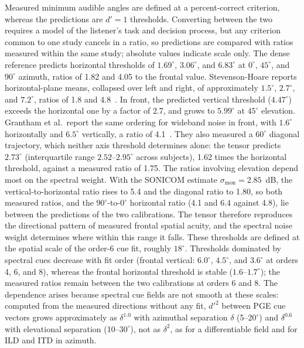 \documentclass[journal]{IEEEtran}
\begin{document}
Measured minimum audible angles are defined at a percent-correct criterion, whereas the predictions are \(d'=1\) thresholds. Converting between the two requires a model of the listener's task and decision process, but any criterion common to one study cancels in a ratio, so predictions are compared with ratios measured within the same study; absolute values indicate scale only. The dense reference predicts horizontal thresholds of \(1.69^\circ\), \(3.06^\circ\), and \(6.83^\circ\) at \(0^\circ\), \(45^\circ\), and \(90^\circ\) azimuth, ratios of 1.82 and 4.05 to the frontal value. Stevenson-Hoare reports horizontal-plane means, collapsed over left and right, of approximately \(1.5^\circ\), \(2.7^\circ\), and \(7.2^\circ\), ratios of 1.8 and 4.8~\cite{StevensonHoare2020}. In front, the predicted vertical threshold (\(4.47^\circ\)) exceeds the horizontal one by a factor of 2.7, and grows to \(5.99^\circ\) at \(45^\circ\) elevation. Grantham et al.\ report the same ordering for wideband noise in front, with \(1.6^\circ\) horizontally and \(6.5^\circ\) vertically, a ratio of 4.1~\cite{Grantham2003}. They also measured a \(60^\circ\) diagonal trajectory, which neither axis threshold determines alone: the tensor predicts \(2.73^\circ\) (interquartile range \(2.52\)--\(2.95^\circ\) across subjects), 1.62 times the horizontal threshold, against a measured ratio of 1.75. The ratios involving elevation depend most on the spectral weight. With the SONICOM estimate \(\sigma_{\mathrm{mon}}=2.85\)~dB, the vertical-to-horizontal ratio rises to 5.4 and the diagonal ratio to 1.80, so both measured ratios, and the \(90^\circ\)-to-\(0^\circ\) horizontal ratio (4.1 and 6.4 against 4.8), lie between the predictions of the two calibrations. The tensor therefore reproduces the directional pattern of measured frontal spatial acuity, and the spectral noise weight determines where within this range it falls. These thresholds are defined at the spatial scale of the order-6 cue fit, roughly $18^\circ$. Thresholds dominated by spectral cues decrease with fit order (frontal vertical: $6.0^\circ$, $4.5^\circ$, and $3.6^\circ$ at orders 4, 6, and 8), whereas the frontal horizontal threshold is stable ($1.6$--$1.7^\circ$); the measured ratios remain between the two calibrations at orders 6 and 8. The dependence arises because spectral cue fields are not smooth at these scales: computed from the measured directions without any fit, $d'^2$ between PGE cue vectors grows approximately as $\delta^{1.0}$ with azimuthal separation $\delta$ (5--$20^\circ$) and $\delta^{0.6}$ with elevational separation (10--$30^\circ$), not as $\delta^2$, as for a differentiable field and for ILD and ITD in azimuth.
\end{document}
